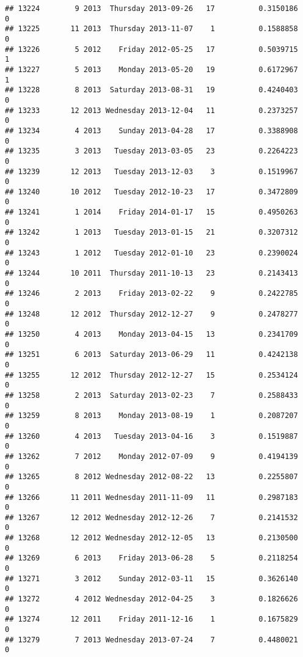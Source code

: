 \documentclass[
]{article}
\begin{document}
\begin{verbatim}
## 13224        9 2013  Thursday 2013-09-26   17          0.3150186             0
## 13225       11 2013  Thursday 2013-11-07    1          0.1588858             0
## 13226        5 2012    Friday 2012-05-25   17          0.5039715             1
## 13227        5 2013    Monday 2013-05-20   19          0.6172967             1
## 13228        8 2013  Saturday 2013-08-31   19          0.4240403             0
## 13233       12 2013 Wednesday 2013-12-04   11          0.2373257             0
## 13234        4 2013    Sunday 2013-04-28   17          0.3388908             0
## 13235        3 2013   Tuesday 2013-03-05   23          0.2264223             0
## 13239       12 2013   Tuesday 2013-12-03    3          0.1519967             0
## 13240       10 2012   Tuesday 2012-10-23   17          0.3472809             0
## 13241        1 2014    Friday 2014-01-17   15          0.4950263             0
## 13242        1 2013   Tuesday 2013-01-15   21          0.3207312             0
## 13243        1 2012   Tuesday 2012-01-10   23          0.2390024             0
## 13244       10 2011  Thursday 2011-10-13   23          0.2143413             0
## 13246        2 2013    Friday 2013-02-22    9          0.2422785             0
## 13248       12 2012  Thursday 2012-12-27    9          0.2478277             0
## 13250        4 2013    Monday 2013-04-15   13          0.2341709             0
## 13251        6 2013  Saturday 2013-06-29   11          0.4242138             0
## 13255       12 2012  Thursday 2012-12-27   15          0.2534124             0
## 13258        2 2013  Saturday 2013-02-23    7          0.2588433             0
## 13259        8 2013    Monday 2013-08-19    1          0.2087207             0
## 13260        4 2013   Tuesday 2013-04-16    3          0.1519887             0
## 13262        7 2012    Monday 2012-07-09    9          0.4194139             0
## 13265        8 2012 Wednesday 2012-08-22   13          0.2255807             0
## 13266       11 2011 Wednesday 2011-11-09   11          0.2987183             0
## 13267       12 2012 Wednesday 2012-12-26    7          0.2141532             0
## 13268       12 2012 Wednesday 2012-12-05   13          0.2130500             0
## 13269        6 2013    Friday 2013-06-28    5          0.2118254             0
## 13271        3 2012    Sunday 2012-03-11   15          0.3626140             0
## 13272        4 2012 Wednesday 2012-04-25    3          0.1826626             0
## 13274       12 2011    Friday 2011-12-16    1          0.1675829             0
## 13279        7 2013 Wednesday 2013-07-24    7          0.4480021             0

\end{verbatim}
\end{document}
